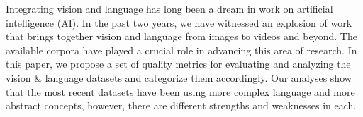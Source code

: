 Integrating vision and language has long been a dream in work on artificial intelligence (AI). In the past two years, we have witnessed an explosion of work that brings together vision and language from images to videos and beyond. The available corpora have played a crucial role in advancing this area of research. In this paper,  we propose a set of quality metrics for evaluating and analyzing the vision \& language datasets and categorize them accordingly. Our analyses show that the most recent datasets have been using more complex language and more abstract concepts, however, there are different strengths and weaknesses in each.
